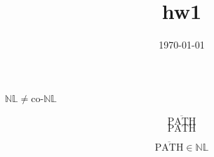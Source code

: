 \documentclass{article}
\title{hw1}
\date{\today}
\begin{document}
\maketitle


\(
    \mathbb{NL} \neq \textrm{co-}\mathbb{NL}
\)

\begin{equation}
    \overline{\textrm{PATH}}
\end{equation}
\begin{equation}
    {\textrm{PATH}}
\end{equation}

\begin{equation}
    \overline{\textrm{PATH}} \in \mathbb{NL}
\end{equation}
\end{document}
